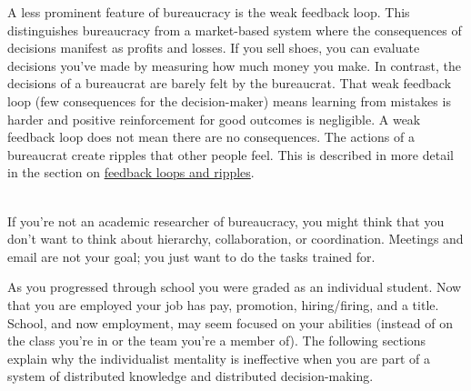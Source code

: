A less prominent feature of bureaucracy is the weak 
\gls{feedback loop}. 
\iftoggle{glossaryinmargin}{\marginpar{[Glossary]}}{} This distinguishes bureaucracy from a market-based system where the consequences of decisions manifest as profits and losses. If you sell shoes, you can evaluate decisions you've made by measuring how much money you make. In contrast, the decisions of a bureaucrat are barely felt by the bureaucrat. That weak feedback loop (few consequences for the decision-maker) means learning from mistakes is harder and positive reinforcement for good outcomes is negligible. A weak feedback loop does not mean there are no consequences. The actions of a bureaucrat create ripples that other people feel. This is described in more detail in the section on \hyperref[sec:feedback-loop-and-ripples]{feedback loops and ripples}.

\ \\

If you're not an academic researcher of bureaucracy, you might think that you don't want to think about hierarchy, collaboration, or coordination. Meetings and email are not your goal; you just want to do the tasks trained for. 

As you progressed through school you were graded as an individual student. Now that you are employed your job has pay, promotion, hiring/firing, and a title. School, and now employment, may seem focused on your abilities (instead of on the class you're in or the team you're a member of). The following sections explain why the individualist mentality is ineffective when you are part of a system of distributed knowledge and distributed decision-making. 


